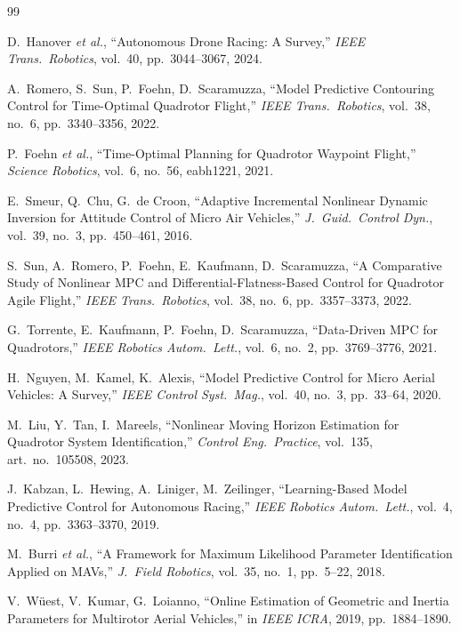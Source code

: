 \documentclass[lettersize,journal]{IEEEtran}
\begin{document}
\begin{thebibliography}{99}

D.~Hanover \emph{et al.},
``Autonomous Drone Racing: A Survey,''
\emph{IEEE Trans.\ Robotics}, vol.~40, pp.~3044--3067, 2024.

A.~Romero, S.~Sun, P.~Foehn, D.~Scaramuzza,
``Model Predictive Contouring Control for Time-Optimal Quadrotor Flight,''
\emph{IEEE Trans.\ Robotics}, vol.~38, no.~6, pp.~3340--3356, 2022.

P.~Foehn \emph{et al.},
``Time-Optimal Planning for Quadrotor Waypoint Flight,''
\emph{Science Robotics}, vol.~6, no.~56, eabh1221, 2021.

E.~Smeur, Q.~Chu, G.~de Croon,
``Adaptive Incremental Nonlinear Dynamic Inversion for Attitude Control of Micro Air Vehicles,''
\emph{J.\ Guid.\ Control Dyn.}, vol.~39, no.~3, pp.~450--461, 2016.

S.~Sun, A.~Romero, P.~Foehn, E.~Kaufmann, D.~Scaramuzza,
``A Comparative Study of Nonlinear MPC and Differential-Flatness-Based Control for Quadrotor Agile Flight,''
\emph{IEEE Trans.\ Robotics}, vol.~38, no.~6, pp.~3357--3373, 2022.

G.~Torrente, E.~Kaufmann, P.~Foehn, D.~Scaramuzza,
``Data-Driven MPC for Quadrotors,''
\emph{IEEE Robotics Autom.\ Lett.}, vol.~6, no.~2, pp.~3769--3776, 2021.

H.~Nguyen, M.~Kamel, K.~Alexis,
``Model Predictive Control for Micro Aerial Vehicles: A Survey,''
\emph{IEEE Control Syst.\ Mag.}, vol.~40, no.~3, pp.~33--64, 2020.

M.~Liu, Y.~Tan, I.~Mareels,
``Nonlinear Moving Horizon Estimation for Quadrotor System Identification,''
\emph{Control Eng.\ Practice}, vol.~135, art.~no.~105508, 2023.

J.~Kabzan, L.~Hewing, A.~Liniger, M.~Zeilinger,
``Learning-Based Model Predictive Control for Autonomous Racing,''
\emph{IEEE Robotics Autom.\ Lett.}, vol.~4, no.~4, pp.~3363--3370, 2019.

M.~Burri \emph{et al.},
``A Framework for Maximum Likelihood Parameter Identification Applied on MAVs,''
\emph{J.\ Field Robotics}, vol.~35, no.~1, pp.~5--22, 2018.

V.~W\"uest, V.~Kumar, G.~Loianno,
``Online Estimation of Geometric and Inertia Parameters for Multirotor Aerial Vehicles,''
in \emph{IEEE ICRA}, 2019, pp.~1884--1890.


\end{thebibliography}
\end{document}
